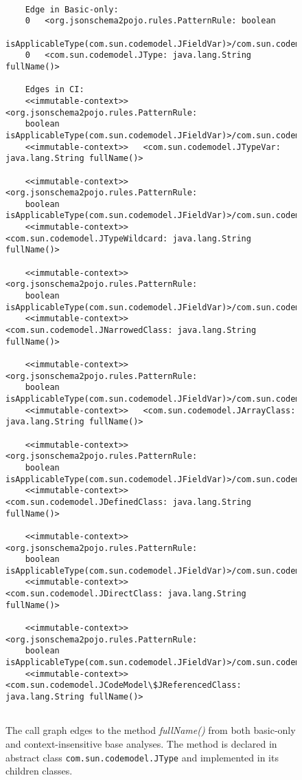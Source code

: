 \begin{figure}
	\begin{lstlisting}[basicstyle=\ttfamily\scriptsize, numbers=none, framesep=4.5mm, framexleftmargin=1.0mm, captionpos=b, escapechar=|]
	
	Edge in Basic-only:
	0	<org.jsonschema2pojo.rules.PatternRule: boolean 
	isApplicableType(com.sun.codemodel.JFieldVar)>/com.sun.codemodel.JClass.fullName/0	
	0	<com.sun.codemodel.JType: java.lang.String fullName()>
	
	Edges in CI:
	<<immutable-context>>	<org.jsonschema2pojo.rules.PatternRule: 
	boolean isApplicableType(com.sun.codemodel.JFieldVar)>/com.sun.codemodel.JClass.fullName/0
	<<immutable-context>>	<com.sun.codemodel.JTypeVar: java.lang.String fullName()>
	
	<<immutable-context>>	<org.jsonschema2pojo.rules.PatternRule: 
	boolean isApplicableType(com.sun.codemodel.JFieldVar)>/com.sun.codemodel.JClass.fullName/0	
	<<immutable-context>>	<com.sun.codemodel.JTypeWildcard: java.lang.String fullName()>
		
	<<immutable-context>>	<org.jsonschema2pojo.rules.PatternRule: 
	boolean isApplicableType(com.sun.codemodel.JFieldVar)>/com.sun.codemodel.JClass.fullName/0	
	<<immutable-context>>	<com.sun.codemodel.JNarrowedClass: java.lang.String fullName()>
	
	<<immutable-context>>	<org.jsonschema2pojo.rules.PatternRule: 
	boolean isApplicableType(com.sun.codemodel.JFieldVar)>/com.sun.codemodel.JClass.fullName/0	
	<<immutable-context>>	<com.sun.codemodel.JArrayClass: java.lang.String fullName()>
	
	<<immutable-context>>	<org.jsonschema2pojo.rules.PatternRule: 
	boolean isApplicableType(com.sun.codemodel.JFieldVar)>/com.sun.codemodel.JClass.fullName/0	
	<<immutable-context>>	<com.sun.codemodel.JDefinedClass: java.lang.String fullName()>
	
	<<immutable-context>>	<org.jsonschema2pojo.rules.PatternRule: 
	boolean isApplicableType(com.sun.codemodel.JFieldVar)>/com.sun.codemodel.JClass.fullName/0	
	<<immutable-context>>	<com.sun.codemodel.JDirectClass: java.lang.String fullName()>
	
	<<immutable-context>>	<org.jsonschema2pojo.rules.PatternRule: 
	boolean isApplicableType(com.sun.codemodel.JFieldVar)>/com.sun.codemodel.JClass.fullName/0	
	<<immutable-context>>	<com.sun.codemodel.JCodeModel\$JReferencedClass: java.lang.String fullName()>
	
	\end{lstlisting}
	\caption{The call graph edges to the method \textit{fullName()} from both basic-only and context-insensitive base analyses. The method is declared in abstract class \texttt{com.sun.codemodel.JType} and implemented in its children classes.}
	\label{fig:edgesToSiblingMethod}
	
\end{figure}

